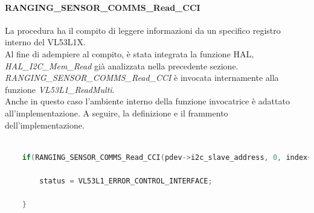 \documentclass[11pt]{report}
\begin{document}
\paragraph{RANGING\_SENSOR\_COMMS\_Read\_CCI}
La procedura ha il compito di leggere informazioni da un specifico registro interno del VL53L1X.\\
Al fine di adempiere al compito, è stata integrata la funzione HAL, \textit{HAL\_I2C\_Mem\_Read} già analizzata nella precedente sezione.
\textit{RANGING\_SENSOR\_COMMS\_Read\_CCI} è invocata internamente alla funzione \textit{VL53L1\_ReadMulti}.\\
Anche in questo caso l'ambiente interno della funzione invocatrice è adattato all'implementazione.
A seguire, la definizione e il frammento dell'implementazione.

\begin{lstlisting}[language=Cpp, caption={Dettaglio sull'implementazione di \textit{RANGING\_SENSOR\_COMMS\_Read\_CCI} in \textit{VL53L1\_ReadMulti}}]
    
    if(RANGING_SENSOR_COMMS_Read_CCI(pdev->i2c_slave_address, 0, index+position, pData+position, data_size) != HAL_OK){

        status = VL53L1_ERROR_CONTROL_INTERFACE;

    }

\end{lstlisting}
\end{document}
